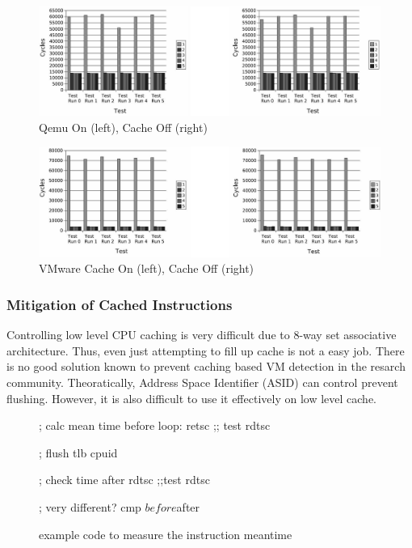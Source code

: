 \begin{figure}[!t]
	\centering
	\includegraphics[width=\textwidth]{figure/qemu.jpg}
	\caption{Qemu On (left), Cache Off (right)}
	\label{fig:cache_qemu}
\end{figure}

\begin{figure}[!t]
	\centering
	\includegraphics[width=\textwidth]{figure/vmware.jpg}
	\caption{VMware Cache On (left), Cache Off (right)}
	\label{fig:cache_vmware}
\end{figure}

\subsubsection{Mitigation of Cached Instructions}
Controlling low level CPU caching is very difficult due to 8-way set associative architecture. Thus, even just attempting to fill up cache is not a easy job. There is no good solution known to prevent caching based VM detection in the resarch community. Theoratically, Address Space Identifier (ASID) can control prevent flushing. However, it is also difficult to use it effectively on low level cache. 

\begin{figure}[h]
\begin{lstc}
; calc mean time before
loop:
	retsc
	;; test
	rdtsc

; flush tlb
cpuid

; check time after
rdtsc
;;test
rdtsc

; very different? 
cmp $before $after
\end{lstc}
\caption{\label{fig:cache_mitigation} example code to measure the instruction meantime}
\end{figure}


